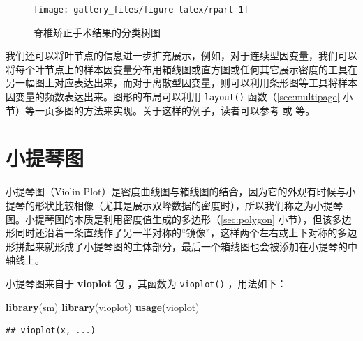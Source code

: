 \documentclass[
  b5paper,
  UTF8,twoside]{book}
\newenvironment{Shaded}{\begin{snugshade}}{\end{snugshade}}
\newcommand{\FunctionTok}[1]{\textcolor[rgb]{0.13,0.29,0.53}{\textbf{#1}}}
\newcommand{\NormalTok}[1]{#1}
\begin{document}
\begin{figure}

{\centering \texttt{[image: gallery\_files/figure-latex/rpart-1]} 

}

\caption[脊椎矫正手术结果的分类树图]{脊椎矫正手术结果的分类树图}\label{fig:rpart}
\end{figure}

我们还可以将叶节点的信息进一步扩充展示，例如，对于连续型因变量，我们可以将每个叶节点上的样本因变量分布用箱线图或直方图或任何其它展示密度的工具在另一幅图上对应表达出来，而对于离散型因变量，则可以利用条形图等工具将样本因变量的频数表达出来。图形的布局可以利用 \texttt{layout()} 函数（\ref{sec:multipage} 小节）等一页多图的方法来实现。关于这样的例子，读者可以参考 \citet{Everitt06} 或 \citet{Xie07} 等。

\section{小提琴图}\label{sec:vioplot}

小提琴图（Violin Plot）是密度曲线图与箱线图的结合，因为它的外观有时候与小提琴的形状比较相像（尤其是展示双峰数据的密度时），所以我们称之为小提琴图。小提琴图的本质是利用密度值生成的多边形（\ref{sec:polygon} 小节），但该多边形同时还沿着一条直线作了另一半对称的``镜像''，这样两个左右或上下对称的多边形拼起来就形成了小提琴图的主体部分，最后一个箱线图也会被添加在小提琴的中轴线上。

小提琴图来自于 \textbf{vioplot} 包 \citep{vioplot}，其函数为 \texttt{vioplot()} ，用法如下：

\begin{Shaded}
\begin{Highlighting}[]
\FunctionTok{library}\NormalTok{(sm)}
\FunctionTok{library}\NormalTok{(vioplot)}
\FunctionTok{usage}\NormalTok{(vioplot)}
\end{Highlighting}
\end{Shaded}

\begin{verbatim}
## vioplot(x, ...)
\end{verbatim}
\end{document}
